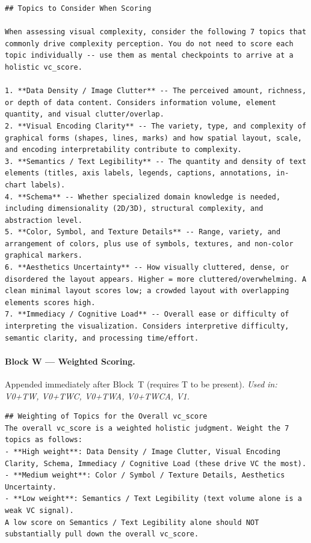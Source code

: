 \begin{lstlisting}
## Topics to Consider When Scoring

When assessing visual complexity, consider the following 7 topics that commonly drive complexity perception. You do not need to score each topic individually -- use them as mental checkpoints to arrive at a holistic vc_score.

1. **Data Density / Image Clutter** -- The perceived amount, richness, or depth of data content. Considers information volume, element quantity, and visual clutter/overlap.
2. **Visual Encoding Clarity** -- The variety, type, and complexity of graphical forms (shapes, lines, marks) and how spatial layout, scale, and encoding interpretability contribute to complexity.
3. **Semantics / Text Legibility** -- The quantity and density of text elements (titles, axis labels, legends, captions, annotations, in-chart labels).
4. **Schema** -- Whether specialized domain knowledge is needed, including dimensionality (2D/3D), structural complexity, and abstraction level.
5. **Color, Symbol, and Texture Details** -- Range, variety, and arrangement of colors, plus use of symbols, textures, and non-color graphical markers.
6. **Aesthetics Uncertainty** -- How visually cluttered, dense, or disordered the layout appears. Higher = more cluttered/overwhelming. A clean minimal layout scores low; a crowded layout with overlapping elements scores high.
7. **Immediacy / Cognitive Load** -- Overall ease or difficulty of interpreting the visualization. Considers interpretive difficulty, semantic clarity, and processing time/effort.
\end{lstlisting}

\paragraph{Block W --- Weighted Scoring.}
Appended immediately after Block~T (requires T to be present).
\textit{Used in: V0+TW, V0+TWC, V0+TWA, V0+TWCA, V1.}

\begin{lstlisting}
## Weighting of Topics for the Overall vc_score
The overall vc_score is a weighted holistic judgment. Weight the 7 topics as follows:
- **High weight**: Data Density / Image Clutter, Visual Encoding Clarity, Schema, Immediacy / Cognitive Load (these drive VC the most).
- **Medium weight**: Color / Symbol / Texture Details, Aesthetics Uncertainty.
- **Low weight**: Semantics / Text Legibility (text volume alone is a weak VC signal).
A low score on Semantics / Text Legibility alone should NOT substantially pull down the overall vc_score.
\end{lstlisting}

